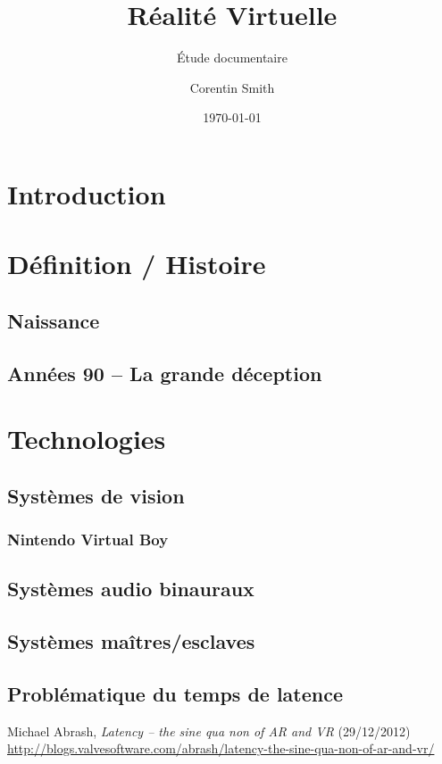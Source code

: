 \documentclass[a4]{scrartcl}
\title{Réalité Virtuelle}
\subtitle{Étude documentaire}
\author{Corentin Smith}
\date{\today}
\begin{document}
\maketitle

\tableofcontents

\newpage
\section{Introduction}

\section{Définition / Histoire}

\subsection{Naissance}
\subsection{Années 90 -- La grande déception}


\section{Technologies}


\subsection{Systèmes de vision}
\subsubsection{Nintendo Virtual Boy}

\subsection{Systèmes audio binauraux}


\subsection{Systèmes maîtres/esclaves}




\subsection{Problématique du temps de latence}

Michael Abrash, \emph{Latency – the sine qua non of AR and VR} (29/12/2012)
\url{http://blogs.valvesoftware.com/abrash/latency-the-sine-qua-non-of-ar-and-vr/}
\end{document}
